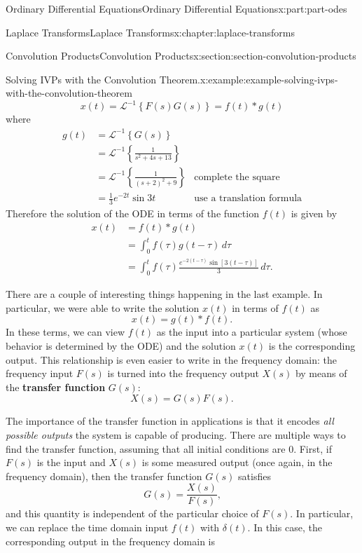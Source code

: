 \documentclass[oneside,10pt,]{book}
\newcommand{\terminology}[1]{\textbf{#1}}
\numberwithin{equation}{part}
\newcommand{\Int}[2]{\int_{#1}^{#2}}
\newcommand{\iLaplace}[1]{\mathcal{L}^{-1}\left\{#1\right\}}
\newcommand{\amp}{&}
\begin{document}
\begin{partptx}{Ordinary Differential Equations}{}{Ordinary Differential Equations}{}{}{x:part:part-odes}
\begin{chapterptx}{Laplace Transforms}{}{Laplace Transforms}{}{}{x:chapter:laplace-transforms}
\begin{sectionptx}{Convolution Products}{}{Convolution Products}{}{}{x:section:section-convolution-products}
\begin{example}{Solving IVPs with the Convolution Theorem.}{x:example:example-solving-ivps-with-the-convolution-theorem}
\begin{equation*}
x(t) = \iLaplace{F(s)G(s)} = f(t)*g(t)
\end{equation*}
where%
\begin{align*}
g(t) \amp= \iLaplace{G(s)}\\
\amp= \iLaplace{\frac{1}{s^{2}+4s+13}} \\
\amp= \iLaplace{\frac{1}{(s+2)^{2}+9}} \amp \text{complete the square}\\
\amp= \frac{1}{3}e^{-2t}\sin3t \amp \text{use a translation formula}
\end{align*}
Therefore the solution of the ODE in terms of the function \(f(t)\) is given by%
\begin{align*}
x(t) \amp= f(t)\ast g(t)\\
\amp= \Int{0}{t}f(\tau)g(t-\tau)\,d\tau\\
\amp= \int_{0}^{t}f(\tau)\frac{e^{-2(t-\tau)}\sin[3(t-\tau)]}{3}\,d\tau\text{.}
\end{align*}
%
\end{example}
There are a couple of interesting things happening in the last example. In particular, we were able to write the solution \(x(t)\) in terms of \(f(t)\) as%
\begin{equation*}
x(t) = g(t)\ast f(t)\text{.}
\end{equation*}
In these terms, we can view \(f(t)\) as the input into a particular system (whose behavior is determined by the ODE) and the solution \(x(t)\) is the corresponding output. This relationship is even easier to write in the frequency domain: the frequency input \(F(s)\) is turned into the frequency output \(X(s)\) by means of the \terminology{transfer function} \(G(s)\):%
\begin{equation*}
X(s) = G(s)F(s)\text{.}
\end{equation*}
%
\par
The importance of the transfer function in applications is that it encodes \emph{all possible outputs} the system is capable of producing. There are multiple ways to find the transfer function, assuming that all initial conditions are \(0\). First, if \(F(s)\) is the input and \(X(s)\) is some measured output (once again, in the frequency domain), then the transfer function \(G(s)\) satisfies%
\begin{equation*}
G(s) = \frac{X(s)}{F(s)}\text{,}
\end{equation*}
and this quantity is independent of the particular choice of \(F(s)\). In particular, we can replace the time domain input \(f(t)\) with \(\delta(t)\). In this case, the corresponding output in the frequency domain is%

\end{sectionptx}
\end{chapterptx}
\end{partptx}
\end{document}

